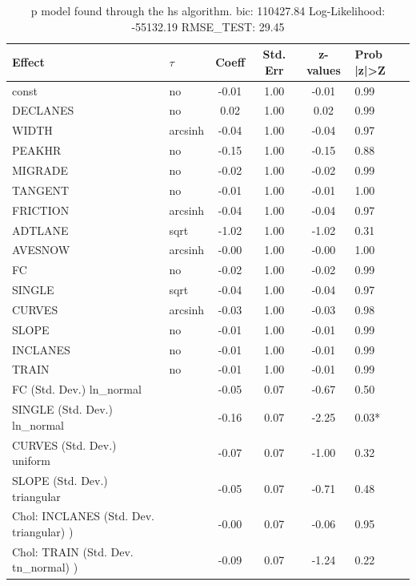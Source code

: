 \begin{table}
	\caption{p model found through the hs algorithm. bic: 110427.84 Log-Likelihood: -55132.19 RMSE_TEST: 29.45}
	\begin{center}
		\begin{tabular}{|l|l|c|c|c|l|}
			\hline
			Effect & $\tau$ & Coeff & Std. Err & z-values & Prob |z|>Z \\
			\hline
			const & no & -0.01 & 1.00 & -0.01 & 0.99 \\
			\hline
			DECLANES & no & 0.02 & 1.00 & 0.02 & 0.99 \\
			\hline
			WIDTH & arcsinh & -0.04 & 1.00 & -0.04 & 0.97 \\
			\hline
			PEAKHR & no & -0.15 & 1.00 & -0.15 & 0.88 \\
			\hline
			MIGRADE & no & -0.02 & 1.00 & -0.02 & 0.99 \\
			\hline
			TANGENT & no & -0.01 & 1.00 & -0.01 & 1.00 \\
			\hline
			FRICTION & arcsinh & -0.04 & 1.00 & -0.04 & 0.97 \\
			\hline
			ADTLANE & sqrt & -1.02 & 1.00 & -1.02 & 0.31 \\
			\hline
			AVESNOW & arcsinh & -0.00 & 1.00 & -0.00 & 1.00 \\
			\hline
			FC & no & -0.02 & 1.00 & -0.02 & 0.99 \\
			\hline
			SINGLE & sqrt & -0.04 & 1.00 & -0.04 & 0.97 \\
			\hline
			CURVES & arcsinh & -0.03 & 1.00 & -0.03 & 0.98 \\
			\hline
			SLOPE & no & -0.01 & 1.00 & -0.01 & 0.99 \\
			\hline
			INCLANES & no & -0.01 & 1.00 & -0.01 & 0.99 \\
			\hline
			TRAIN & no & -0.01 & 1.00 & -0.01 & 0.99 \\
			\hline
			FC (Std. Dev.) ln_normal &  & -0.05 & 0.07 & -0.67 & 0.50 \\
			\hline
			SINGLE (Std. Dev.) ln_normal &  & -0.16 & 0.07 & -2.25 & 0.03* \\
			\hline
			CURVES (Std. Dev.) uniform &  & -0.07 & 0.07 & -1.00 & 0.32 \\
			\hline
			SLOPE (Std. Dev.) triangular &  & -0.05 & 0.07 & -0.71 & 0.48 \\
			\hline
			 Chol: INCLANES (Std. Dev. triangular) ) &  & -0.00 & 0.07 & -0.06 & 0.95 \\
			\hline
			 Chol: TRAIN (Std. Dev. tn_normal) ) &  & -0.09 & 0.07 & -1.24 & 0.22 \\

\end{tabular}
\end{center}
\end{table}
